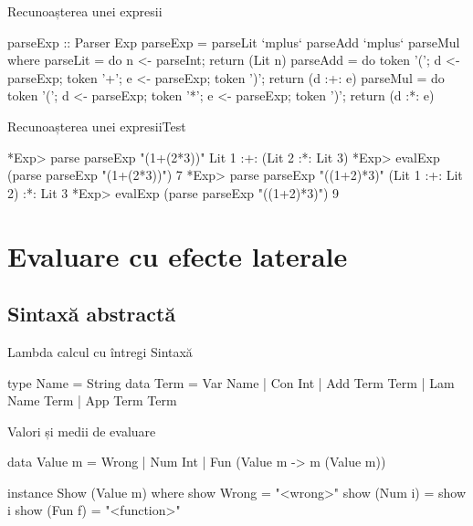 \documentclass[xcolor=pdftex,romanian,colorlinks]{beamer}
\begin{document}


\begin{frame}[fragile]{Recunoașterea unei expresii}
\begin{asciihs}
  parseExp :: Parser Exp
  parseExp = parseLit `mplus` parseAdd `mplus` parseMul
    where
    parseLit = do { n <- parseInt;
                    return (Lit n) }
    parseAdd = do { token '(';
                    d <- parseExp;
                    token '+';
                    e <- parseExp;
                    token ')';
                    return (d :+: e) }
    parseMul = do { token '(';
                    d <- parseExp;
                    token '*';
                    e <- parseExp;
                    token ')';
                    return (d :*: e) }
\end{asciihs}
\end{frame}



\begin{frame}[fragile]{Recunoașterea unei expresii}{Test}
\begin{asciihs}
  *Exp> parse parseExp "(1+(2*3))"
  Lit 1 :+: (Lit 2 :*: Lit 3)
  *Exp> evalExp (parse parseExp "(1+(2*3))")
  7
  *Exp> parse parseExp "((1+2)*3)"
  (Lit 1 :+: Lit 2) :*: Lit 3
  *Exp> evalExp (parse parseExp "((1+2)*3)")
  9
\end{asciihs}
\end{frame}



\section{Evaluare cu efecte laterale}

\subsection{Sintaxă abstractă}

\begin{frame}[fragile]{Lambda calcul cu întregi}
{Sintaxă}
\begin{asciihs}
type Name = String
data Term
  = Var Name
  | Con Int
  | Add Term Term
  | Lam Name Term
  | App Term Term
\end{asciihs}
\end{frame}


\begin{frame}[fragile]
{Valori și medii de evaluare}
\begin{asciihs}
data Value m
  = Wrong
  | Num Int
  | Fun (Value m -> m (Value m))
  
instance Show (Value m) where
  show Wrong = "<wrong>"
  show (Num i) = show i
  show (Fun f) = "<function>"
\end{asciihs}
\end{frame}
\end{document}
